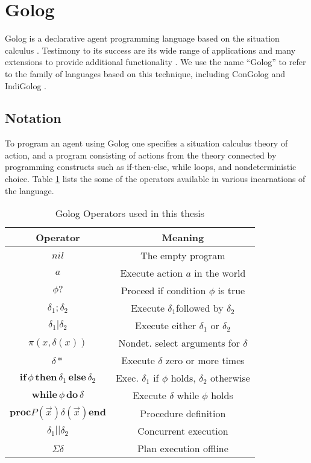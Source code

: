 \section{Golog\label{sec:Background:Golog}}

Golog is a declarative agent programming language based on the situation
calculus \citep{levesque97golog}. Testimony to its success are its
wide range of applications and many extensions to provide additional
functionality \citep{giacomo00congolog,giacomo99indigolog,Ferrein2005readylog}.
We use the name {}``Golog'' to refer to the family of languages
based on this technique, including ConGolog \citep{giacomo00congolog}
and IndiGolog \citep{giacomo99indigolog}.


\subsection{Notation}

To program an agent using Golog one specifies a situation calculus
theory of action, and a program consisting of actions from the theory
connected by programming constructs such as if-then-else, while loops,
and nondeterministic choice. Table \ref{tbl:Background:Golog-Operators}
lists the some of the operators available in various incarnations
of the language.%
\begin{table}[h]
\begin{centering}
\begin{tabular}{|c|c|}
\hline 
Operator  & Meaning\tabularnewline
\hline
\hline 
$nil$  & The empty program\tabularnewline
\hline 
$a$  & Execute action $a$ in the world\tabularnewline
\hline 
$\phi?$  & Proceed if condition $\phi$ is true\tabularnewline
\hline 
$\delta_{1};\delta_{2}$  & Execute $\delta_{1}$followed by $\delta_{2}$\tabularnewline
\hline 
$\delta_{1}|\delta_{2}$  & Execute either $\delta_{1}$ or $\delta_{2}$\tabularnewline
\hline 
$\pi(x,\delta(x))$  & Nondet. select arguments for $\delta$\tabularnewline
\hline 
$\delta*$  & Execute $\delta$ zero or more times\tabularnewline
\hline 
$\mathbf{if}\,\phi\,\mathbf{then}\,\delta_{1}\,\mathbf{else}\,\delta_{2}$  & Exec. $\delta_{1}$ if $\phi$ holds, $\delta_{2}$ otherwise\tabularnewline
\hline 
$\mathbf{while\,}\phi\mathbf{\, do}\,\delta$  & Execute $\delta$ while $\phi$ holds\tabularnewline
\hline 
$\mathbf{proc}P(\overrightarrow{x})\delta(\overrightarrow{x})\mathbf{end}$  & Procedure definition\tabularnewline
\hline 
$\delta_{1}||\delta_{2}$  & Concurrent execution\tabularnewline
\hline 
$\Sigma\delta$  & Plan execution offline\tabularnewline
\hline
\end{tabular}
\par\end{centering}

\caption{Golog Operators used in this thesis\label{tbl:Background:Golog-Operators} }

\end{table}


